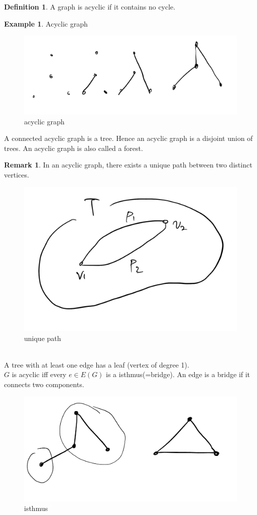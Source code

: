 \documentclass{article}
\theoremstyle{definition}
\newtheorem{defn}{Definition}[]
\newtheorem{ex}{Example}[]
\newtheorem*{rmk*}{Remark}
\begin{document}
\begin{defn}
    A graph is acyclic if it contains no cycle. 
\end{defn}
\begin{ex} Acyclic graph
    \begin{figure}[!h]
        \centerline{\includegraphics[width=0.5\columnwidth]{img/acyclic.jpg}}
        \caption{acyclic graph}
        \label{a g} 
    \end{figure}
\end{ex}
A connected acyclic graph is a tree. Hence an acyclic graph is 
a disjoint union of trees. An acyclic graph is also called a forest.
\begin{rmk*}
    In an acyclic graph, there exists a unique path between 
    two distinct vertices. 
    \begin{figure}[!h]
        \centerline{\includegraphics[width=0.5\columnwidth]{img/tree_unique.jpeg}}
        \caption{unique path}
        \label{u p} 
    \end{figure} \\ 
    A tree with at least one edge has a leaf (vertex of degree 1). \\
    $G$ is acyclic iff every $e\in E(G)$ is a isthmus(=bridge).
    An edge is a bridge if it connects two components.
    \begin{figure}[!h]
        \centerline{\includegraphics[width=0.5\columnwidth]{img/isthmus.jpeg}}
        \caption{isthmus}
        \label{imus} 
    \end{figure}
\end{rmk*}
\end{document}
